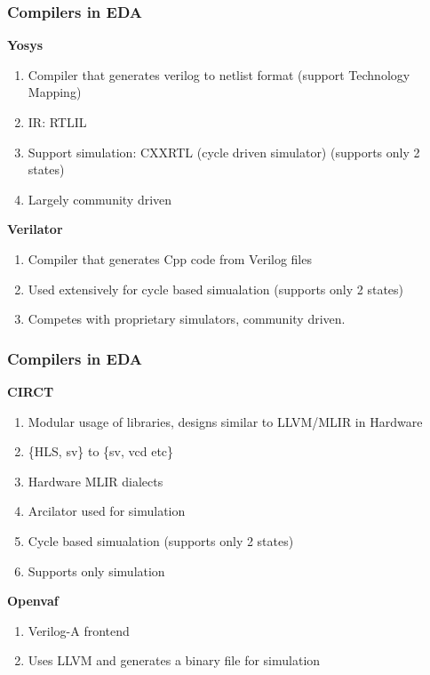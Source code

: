 \documentclass{beamer}
\begin{document}
\newcommand\myheading[1]{%
  \par\bigskip
  {\Large\bfseries#1}\par\smallskip}

\begin{frame}[fragile]
    \frametitle{Compilers in EDA}
     \myheading{Yosys} 
        \begin{enumerate}
            \item Compiler that generates  verilog to netlist format (support Technology Mapping)
            \item IR: RTLIL
            \item Support simulation: CXXRTL (cycle driven simulator) (supports
              only 2 states)
            \item Largely community driven
        \end{enumerate}
    \myheading{Verilator}
        \begin{enumerate}
            \item Compiler that generates Cpp code from Verilog files
            \item Used extensively for cycle based simualation (supports only 2 states)
            \item Competes with proprietary simulators, community driven.
        \end{enumerate}
    
\end{frame}

\begin{frame}[fragile]
    \frametitle{Compilers in EDA}
    \myheading{CIRCT}
        \begin{enumerate}
            \item Modular usage of libraries, designs similar to LLVM/MLIR in Hardware  
            \item \{HLS, sv\} to \{sv, vcd etc\}
            \item Hardware MLIR  dialects 
            \item Arcilator used for simulation 
                \item Cycle based simualation (supports only 2 states)
            \item Supports only simulation 
        \end{enumerate}
    \myheading{Openvaf}
        \begin{enumerate}
            \item Verilog-A frontend 
            \item Uses LLVM and generates a binary file for simulation
        \end{enumerate}
\end{frame}
\end{document}
